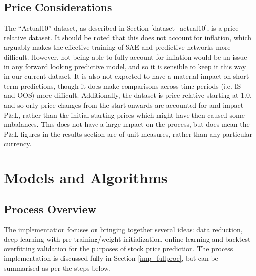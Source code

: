 \documentclass[a4paper,11pt,oneside]{article}
\theoremstyle{plain}
\theoremstyle{definition}
\begin{document}
	\subsection{Price Considerations}\label{data_prices}
	
	The ``Actual10'' dataset, as described in Section \ref{dataset_actual10}, is a price relative dataset. It should be noted that this does not account for inflation, which arguably makes the effective training of SAE and predictive networks more difficult. However, not being able to fully account for inflation would be an issue in any forward looking predictive model, and so it is sensible to keep it this way in our current dataset. It is also not expected to have a material impact on short term predictions, though it does make comparisons across time periods (i.e. IS and OOS) more difficult. Additionally, the dataset is price relative starting at 1.0, and so only price changes from the start onwards are accounted for and impact P\&L, rather than the initial starting prices which might have then caused some imbalances. This does not have a large impact on the process, but does mean the P\&L figures in the results section are of unit measures, rather than any particular currency.
	
	\newpage
	\section{Models and Algorithms}\label{Implementation}
	\subsection{Process Overview}\label{ProcessOverview}\label{imp_overview}
	
	
	The implementation focuses on bringing together several ideas: data reduction, deep learning with pre-training/weight initialization, online learning and backtest overfitting validation for the purposes of stock price prediction. The process implementation is discussed fully in Section \ref{imp_fullproc}, but can be summarised as per the steps below.
	
\end{document}
